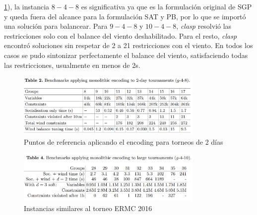 \documentclass[letter, 10pt]{article}
\begin{document}
\ref{fig:table5}), la instancia $8-4-8$ es significativa ya que es la formulación original de SGP y queda fuera del alcance para la formulación SAT y PB, por lo que se importó una solución para balancear. Para $9-4-8$ y $10-4-8$, \textit{clasp} resolvió las restricciones solo con el balance del viento deshabilitado. Para el resto, \textit{clasp} encontró soluciones sin respetar de 2 a 21 restricciones con el viento. En todos los casos se pudo sintonizar perfectamente el balance del viento, satisfaciendo todas las restricciones, usualmente en menos de 2s. 

\begin{figure}[h]
    \centering
    \includegraphics[width=0.8\textwidth]{figures/table5_monolithic.png}
    \caption{Puntos de referencia aplicando el encoding para torneos de 2 días}
    \label{fig:table5}
\end{figure}

\begin{figure}[h]
    \centering
    \includegraphics[width=0.8\textwidth]{figures/table6_monolithic.png}
    \caption{Instancias similares al torneo ERMC 2016}
    \label{fig:enter-table6}
\end{figure}
\end{document}
